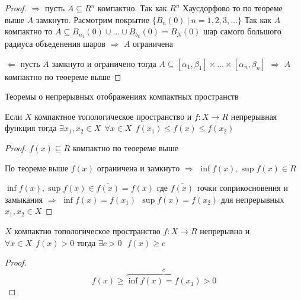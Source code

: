 \begin{proof}
  $\Rightarrow$ пусть $A \subseteq R^n$ компактно. Так как $R^n$ Хаусдорфово
  то по теореме выше $A$ замкнуто. Расмотрим покрытие $\{B_n(0) ~ | ~
  n = 1,2,3, \ldots \}$ Так как $A$ компактно то $A \subseteq B_{n_1}(0) \cup
  \ldots \cup B_{b_k}(0) = B_N(0)$ шар самого большого радиуса объеденения
  шаров $\Rightarrow$ $A$ ограничена

  $\Leftarrow$ пусть $A$ замкнуто и ограничено тогда $A \subseteq [\alpha_1,
  \beta_1] \times \ldots \times [\alpha_n, \beta_n]$ $\Rightarrow$ $A$ компактно
  по теоереме выше
\end{proof}

\begin{title}[\Large]
  Теоремы о непрерывных отображениях компактных пространств
\end{title}

\begin{theorem}[Вейерштрасса]
  Если $X$ компактное топологическое пространство и $f: X \to R$ непрерывная
  функция тогда $\exists x_1, x_2 \in X ~~ \forall x \in X ~~
  f(x_1) \le f(x) \le f(x_2)$
\end{theorem}

\begin{proof}
  $f(x) \subseteq R$ компактно по теоереме выше

  По теореме выше $f(x)$ ограничена и замкнуто $\Rightarrow$ $\inf f(x),
  \sup f(x) \in R$

  $\inf f(x), \sup f(x) \in \overline{f(x)} = f(x)$ где $\overline{f(x)}$
  точки соприкосновения и замыкания $\Rightarrow$ $\inf f(x) = f(x_1) ~~
  \sup f(x) = f(x_2)$ для непрерывных $x_1, x_2 \in X$
\end{proof}

\begin{block}[Следствие]
  $X$ компактно топологическое пространство $f: X \to R$ непрерывно и
  $\forall x \in X ~~ f(x) > 0$ тогда $\exists c > 0 ~~~ f(x) \ge c$
\end{block}

\begin{proof}
   $$
   f(x) \ge \overbrace{\inf f(x) = f(x_1)}^c > 0
   $$
\end{proof}

